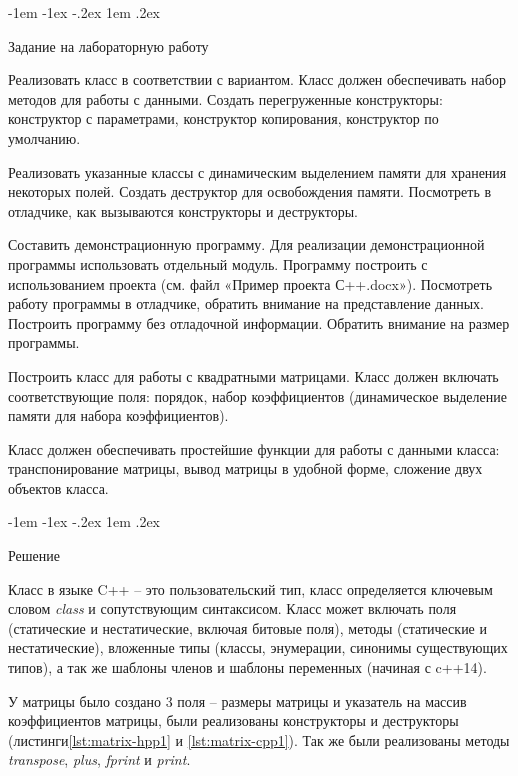 \documentclass[a4paper,14pt,oneside,final]{extreport}
\makeatletter
\newlength{\fivecharsapprox}
\renewcommand\subsection{%
  \@startsection{subsection}{2}%
    {\fivecharsapprox}%
    {-1em \@plus -1ex \@minus -.2ex}%
    {1em \@plus .2ex}%
    {\raggedright\hyphenpenalty=10000\normalfont\normalsize\bfseries}}
\makeatother
\begin{document}
  \subsection{Задание на лабораторную работу}
  \par Реализовать класс в соответствии с вариантом. Класс должен обеспечивать набор методов для работы с данными. Создать перегруженные конструкторы: конструктор с параметрами, конструктор копирования, конструктор по умолчанию.
  \par Реализовать указанные классы с динамическим выделением памяти для хранения некоторых полей. Создать деструктор для освобождения памяти. Посмотреть в отладчике, как вызываются конструкторы и деструкторы.
  \par Составить демонстрационную программу. Для реализации демонстрационной программы использовать отдельный модуль. Программу построить с использованием проекта (см. файл «Пример проекта С++.docx»). Посмотреть работу программы в отладчике, обратить внимание на представление данных. Построить программу без отладочной информации. Обратить внимание на размер программы.
  \par Построить класс для работы с квадратными матрицами. Класс должен включать соответствующие поля: порядок, набор коэффициентов (динамическое выделение памяти для набора коэффициентов).
  \par Класс должен обеспечивать простейшие функции для работы с данными класса: транспонирование матрицы, вывод матрицы в удобной форме, сложение двух объектов класса.

  \subsection{Решение}
  \par Класс в языке C++ -- это пользовательский тип, класс определяется ключевым словом \textit{class} и сопутствующим синтаксисом. Класс может включать поля (статические и нестатические, включая битовые поля), методы (статические и нестатические), вложенные типы (классы, энумерации, синонимы существующих типов), а так же шаблоны членов и шаблоны переменных (начиная с c++14).

  \par У матрицы было создано 3 поля -- размеры матрицы и указатель на массив коэффициентов матрицы, были реализованы конструкторы и деструкторы (листинги\ref{lst:matrix-hpp1} и \ref{lst:matrix-cpp1}). Так же были реализованы методы \textit{transpose}, \textit{plus}, \textit{fprint} и \textit{print}.
\end{document}
